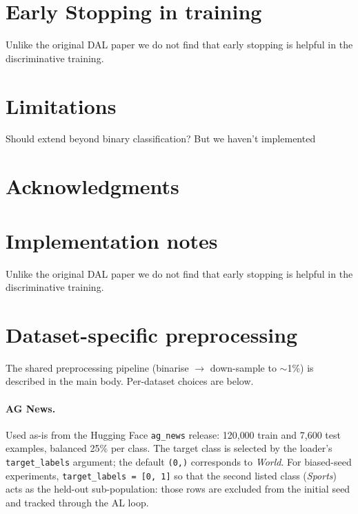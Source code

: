\documentclass[11pt]{article}
\begin{document}
\section{Early Stopping in training}
Unlike the original DAL paper we do not find that early stopping is helpful in the discriminative training. 

\section{Limitations}


Should extend beyond binary classification? But we haven't implemented 

\section*{Acknowledgments}




\appendix

\section{Implementation notes}
\label{sec:appendix}

Unlike the original DAL paper we do not find that early stopping is helpful in the discriminative training.

\section{Dataset-specific preprocessing}
\label{sec:appendix-datasets}

The shared preprocessing pipeline (binarise $\to$ down-sample to $\sim$1\%) is described in the main body. Per-dataset choices are below.

\paragraph{AG News.} Used as-is from the Hugging Face \texttt{ag\_news} release: 120{,}000 train and 7{,}600 test examples, balanced 25\% per class. The target class is selected by the loader's \texttt{target\_labels} argument; the default \texttt{(0,)} corresponds to \emph{World}. For biased-seed experiments, \texttt{target\_labels = [0, 1]} so that the second listed class (\emph{Sports}) acts as the held-out sub-population: those rows are excluded from the initial seed and tracked through the AL loop.
\end{document}
